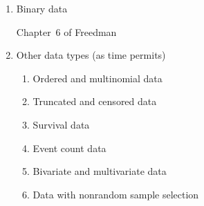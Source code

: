 \documentclass[11pt]{article}
\begin{document}
\begin{enumerate}
\begin{enumerate}
  \item Binary data

    \medskip Chapter~6 of Freedman

  \item Other data types (as time permits)
    \begin{enumerate}
    \item Ordered and multinomial data
      
    \item Truncated and censored data
      
    \item Survival data
      
    \item Event count data
      
    \item Bivariate and multivariate data
      
    \item Data with nonrandom sample selection

    \end{enumerate}
  \end{enumerate}

\end{enumerate}
\end{document}
